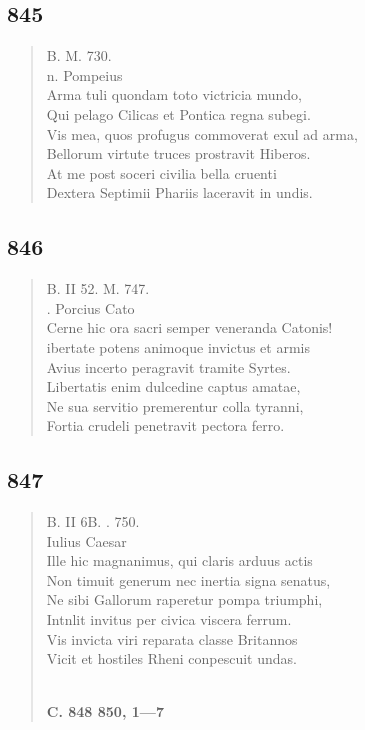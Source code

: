 \documentclass[11pt, a4paper]{report}
\begin{document}
            \subsection*{845}
      \begin{verse}
      B. M. 730. \\ n. Pompeius \\ Arma tuli quondam toto victricia mundo, \\ Qui pelago Cilicas et Pontica regna subegi. \\ Vis mea, quos profugus commoverat exul ad arma, \\ Bellorum virtute truces prostravit Hiberos. \\ At me post soceri civilia bella cruenti \\ Dextera Septimii Phariis laceravit in undis. \\ 
      \end{verse}
  
            \subsection*{846}
      \begin{verse}
      B. II 52. M. 747. \\ . Porcius Cato \\ Cerne hic ora sacri semper veneranda Catonis! \\ ibertate potens animoque invictus et armis \\ Avius incerto peragravit tramite Syrtes. \\ Libertatis enim dulcedine captus amatae, \\ Ne sua servitio premerentur colla tyranni, \\ Fortia crudeli penetravit pectora ferro. \\ 
      \end{verse}
  
            \subsection*{847}
      \begin{verse}
      B. II 6B. . 750. \\ Iulius Caesar \\ Ille hic magnanimus, qui claris arduus actis \\ Non timuit generum nec inertia signa senatus, \\ Ne sibi Gallorum raperetur pompa triumphi, \\ Intnlit invitus per civica viscera ferrum. \\ Vis invicta viri reparata classe Britannos \\ Vicit et hostiles Rheni conpescuit undas. \\ 
        ﻿\pagebreak 
    \begin{center} \textbf{C. 848 850, 1—7} \end{center} \marginpar{[307]} 
      \end{verse}
  
\end{document}
